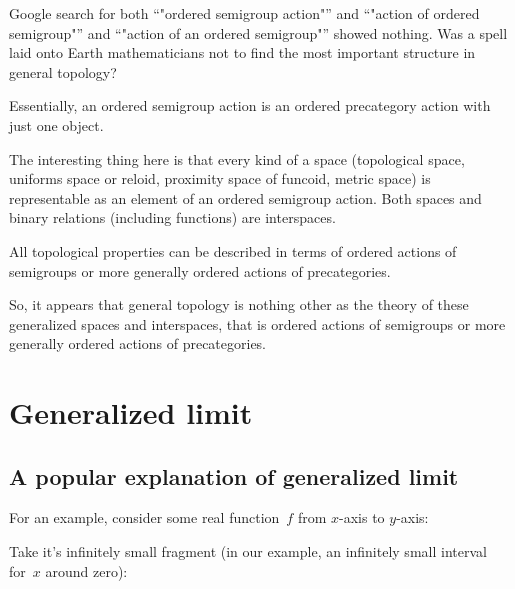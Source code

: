 \documentclass{amsart}
\begin{document}
\begin{rem}
Google search for both ``"ordered semigroup action"'' and ``"action of ordered semigroup"'' and ``"action of an ordered semigroup"'' showed nothing. Was a spell laid onto Earth mathematicians not to find the most important structure in general topology?
\end{rem}

Essentially, an ordered semigroup action is an ordered precategory action with just one object.

The interesting thing here is that every kind of a space
(topological space, uniforms space or reloid, proximity space
of funcoid, metric space) is representable as an element of
an ordered semigroup action. Both spaces and binary relations
(including functions) are interspaces.

All topological properties can be described in terms of
ordered actions of semigroups or more generally ordered actions of precategories.

So, it appears that general topology is nothing other as the
theory of these generalized spaces and interspaces, that is
ordered actions of semigroups or more generally ordered actions of precategories.

\section{Generalized limit}

\subsection{A popular explanation of generalized limit}

For an example, consider some real function~$f$ from $x$-axis to $y$-axis:
\begin{figure}[H]
\end{figure}
 
Take it's infinitely small fragment (in our example, an infinitely small interval for~$x$ around zero):
\begin{figure}[H]
\end{figure}
\end{document}
